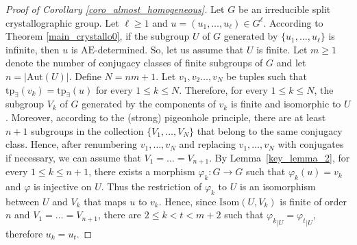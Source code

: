 \documentclass[a4paper, 11pt]{amsart}
\newtheorem{lemme}[te]{Lemma}
\theoremstyle{definition}
\theoremstyle{remark}
\newtheorem{rk}[te]{Remark}
\renewcommand{\leq}{\leqslant}
\renewcommand{\geq}{\geqslant}
\begin{document}
\begin{proof}[Proof of Corollary \ref{coro_almost_homogeneous}]
Let $G$ be an irreducible split crystallographic group. Let $\ell\geq 1$ and $u=(u_1,\ldots,u_{\ell})\in G^{\ell}$. According to Theorem \ref{main_crystallo0}, if the subgroup $U$ of $G$ generated by $\lbrace u_1,\ldots,u_{\ell}\rbrace$ is infinite, then $u$ is $\mathrm{AE}$-determined. So, let us assume that $U$ is finite. Let $m\geq 1$ denote the number of conjugacy classes of finite subgroups of $G$ and let $n=\vert \mathrm{Aut}(U)\vert$. Define $N=nm+1$. Let $v_1,v_2\ldots,v_N$ be tuples such that $\mathrm{tp}_{\exists}(v_k)=\mathrm{tp}_{\exists}(u)$ for every $1\leq k\leq N$. Therefore, for every $1\leq k\leq N$, the subgroup $V_k$ of $G$ generated by the components of $v_k$ is finite and isomorphic to $U$. Moreover, according to the (strong) pigeonhole principle, there are at least $n+1$ subgroups in the collection $\lbrace V_1,\ldots,V_N\rbrace$ that belong to the same conjugacy class. Hence, after renumbering $v_1,\ldots,v_N$ and replacing $v_1,\ldots,v_N$ with conjugates if necessary, we can assume that $V_1=\ldots = V_{n+1}$. By Lemma~\ref{key_lemma_2}, for every $1\leq k\leq n+1$, there exists a morphism $\varphi_k:G\rightarrow G$ such that $\varphi_k(u)=v_k$ and $\varphi$ is injective on $U$. Thus the restriction of $\varphi_k$ to $U$ is an isomorphism between $U$ and $V_k$ that maps $u$ to $v_k$. Hence, since $\mathrm{Isom}(U,V_k)$ is finite of order $n$ and $V_1=\ldots = V_{n+1}$, there are $2\leq k < t < m+2$ such that ${\varphi_k}_{\vert U}={\varphi_{t}}_{\vert U}$, therefore $u_k=u_{t}$.\end{proof}




\end{document}
